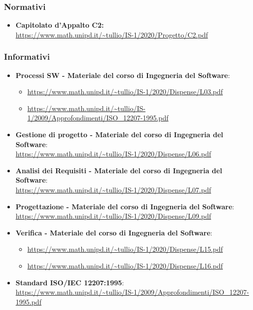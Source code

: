 \subsubsection{Normativi}\label{RiferimentiNormativi}
\begin{itemize}
\item \textbf{Capitolato d'Appalto C2:} \\ \url{https://www.math.unipd.it/~tullio/IS-1/2020/Progetto/C2.pdf}
\end{itemize}

\subsubsection{Informativi}\label{RiferimentiInformativi}
\begin{itemize}
	\item \textbf{Processi SW - Materiale del corso di Ingegneria del Software}:
	\begin{itemize}
		\item \url{https://www.math.unipd.it/~tullio/IS-1/2020/Dispense/L03.pdf}
		\item \url{https://www.math.unipd.it/~tullio/IS-1/2009/Approfondimenti/ISO_12207-1995.pdf}
	\end{itemize}
	\item \textbf{Gestione di progetto - Materiale del corso di Ingegneria del Software}:\\
	\url{https://www.math.unipd.it/~tullio/IS-1/2020/Dispense/L06.pdf}
	\item \textbf{Analisi dei Requisiti - Materiale del corso di Ingegneria del Software}:\\
	\url{https://www.math.unipd.it/~tullio/IS-1/2020/Dispense/L07.pdf}
	\item \textbf{Progettazione - Materiale del corso di Ingegneria del Software}:\\
	\url{https://www.math.unipd.it/~tullio/IS-1/2020/Dispense/L09.pdf}
	\item \textbf{Verifica - Materiale del corso di Ingegneria del Software}:
	\begin{itemize}
		\item \url{https://www.math.unipd.it/~tullio/IS-1/2020/Dispense/L15.pdf}
		\item \url{https://www.math.unipd.it/~tullio/IS-1/2020/Dispense/L16.pdf}
	\end{itemize}
	\item \textbf{Standard ISO/IEC 12207:1995}:\\
	\url{https://www.math.unipd.it/~tullio/IS-1/2009/Approfondimenti/ISO_12207-1995.pdf}

\end{itemize}
